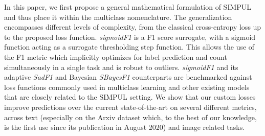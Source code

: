 In this paper, we first propose a general mathematical formulation of SIMPUL and thus place it within the multiclass nomenclature.  The generalization encompasses different levels of complexity, from the classical cross-entropy loss up to the proposed loss function. \emph{sigmoidF1} is a F1 score surrogate, with a sigmoid function acting as a surrogate thresholding step function. This allows the use of the F1 metric which implicitly optimizes for label prediction and count simultaneously in a single task and is robust to outliers.  \emph{sigmoidF1} and its adaptive \emph{SadF1} and Bayesian \emph{SBayesF1} counterparts are benchmarked against loss functions commonly used in multiclass learning and other existing models that are closely related to the SIMPUL setting. We show that our custom losses improve predictions over the current  state-of-the-art on several different metrics, across text (especially on the Arxiv dataset which, to the best of our knowledge, is the first use since its publication in August 2020) and image related tasks.










